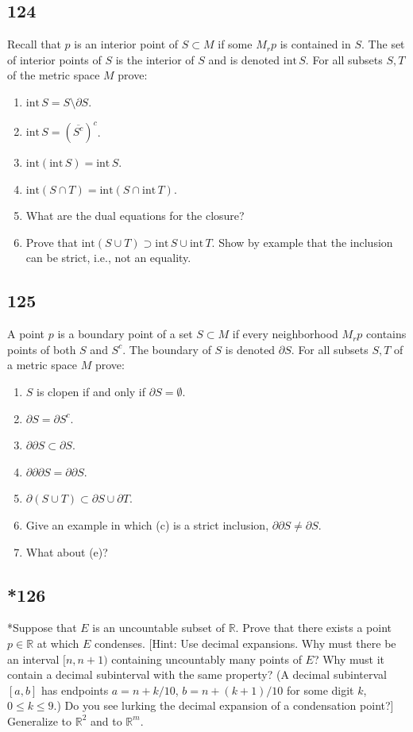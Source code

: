 \documentclass{amsart}
\begin{document}
\subsection*{124}
Recall that $p$ is an interior point of $S \subset M$ if some $M_r p$ is contained in $S$. The set of interior points of $S$ is the interior of $S$ and is denoted $\mathrm{int}\, S$. For all subsets $S,T$ of the metric space $M$ prove:
\begin{enumerate}[label=(\alph*)]
\item $\mathrm{int}\, S = S \setminus \partial S$.
\item $\mathrm{int}\, S = (\overline{S^c})^c$.
\item $\mathrm{int}(\mathrm{int}\, S) = \mathrm{int}\, S$.
\item $\mathrm{int}(S \cap T) = \mathrm{int}(S \cap \mathrm{int}\, T)$.
\item What are the dual equations for the closure?
\item Prove that $\mathrm{int}(S \cup T) \supset \mathrm{int}\, S \cup \mathrm{int}\, T$. Show by example that the inclusion can be strict, i.e., not an equality.
\end{enumerate}

\subsection*{125}
A point $p$ is a boundary point of a set $S \subset M$ if every neighborhood $M_r p$ contains points of both $S$ and $S^c$. The boundary of $S$ is denoted $\partial S$. For all subsets $S, T$ of a metric space $M$ prove:
\begin{enumerate}[label=(\alph*)]
\item $S$ is clopen if and only if $\partial S = \emptyset$.
\item $\partial S = \partial S^c$.
\item $\partial \partial S \subset \partial S$.
\item $\partial \partial \partial S = \partial \partial S$.
\item $\partial(S \cup T) \subset \partial S \cup \partial T$.
\item Give an example in which (c) is a strict inclusion, $\partial \partial S \ne \partial S$.
\item What about (e)?
\end{enumerate}

\subsection*{*126}
*Suppose that $E$ is an uncountable subset of $\mathbb{R}$. Prove that there exists a point $p \in \mathbb{R}$ at which $E$ condenses. [Hint: Use decimal expansions. Why must there be an interval $[n,n+1)$ containing uncountably many points of $E$? Why must it contain a decimal subinterval with the same property? (A decimal subinterval $[a,b]$ has endpoints $a = n+k/10$, $b = n+(k+1)/10$ for some digit $k$, $0 \le k \le 9$.) Do you see lurking the decimal expansion of a condensation point?] Generalize to $\mathbb{R}^2$ and to $\mathbb{R}^m$.
\end{document}
